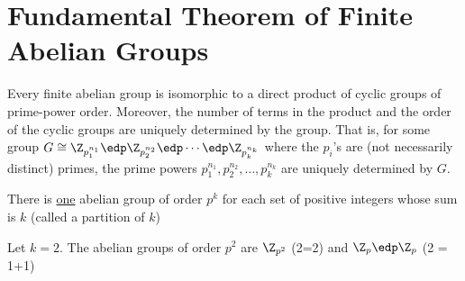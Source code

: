 \section{Fundamental Theorem of Finite Abelian Groups}

\begin{theorem}
    Every finite abelian group is isomorphic to a direct product of cyclic groups of prime-power order. Moreover, the number of terms in the product and the order of the cyclic groups are uniquely determined by the group. That is, for some group \(G\cong \Z_{p_1^{n_1}}\edp \Z_{p_2^{n_2}}\edp\cdots\edp \Z_{p_k^{n_k}}\) where the \(p_i\)'s are (not necessarily distinct) primes, the prime powers \(p_1^{n_1},p_2^{n_2},\ldots,p_k^{n_k}\) are uniquely determined by \(G\).
\end{theorem}


\begin{theorem}
    There is \ul{one} abelian group of order \(p^k\) for each set of positive integers whose sum is \(k\) (called a partition of \(k\))
\end{theorem}

\begin{example}
    Let \(k=2\). The abelian groups of order \(p^2\) are \(\Z_{p^2}\) (2=2) and \(\Z_p\edp\Z_p\) (2 = 1+1)
\end{example}

